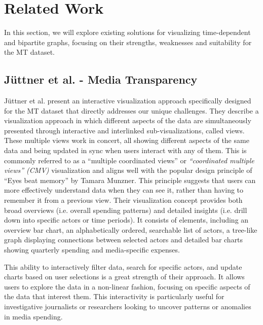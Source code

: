\documentclass{vgtc}                          %
\begin{document}
\section{Related Work} %


In this section, we will explore existing solutions for visualizing time-dependent and bipartite graphs, focusing on their strengths, weaknesses and suitability for the MT dataset.

\subsection{Jüttner et al. - Media Transparency}

Jüttner et al. \cite{Jttner2017MediaTI} present an interactive visualization approach specifically designed for the MT dataset that directly addresses our unique challenges.
They describe a visualization approach in which different aspects of the data are simultaneously presented through interactive and interlinked sub-visualizations, called views. These multiple views work in concert, all showing different aspects of the same data and being updated in sync when users interact with any of them. This is commonly referred to as a ``multiple coordinated views'' or \textit{``coordinated multiple views'' (CMV)} \cite{roberts2007state} visualization and aligns well with the popular design principle of ``Eyes beat memory'' by Tamara Munzner. This principle suggests that users can more effectively understand data when they can see it, rather than having to remember it from a previous view. Their visualization concept provides both broad overviews (i.e. overall spending patterns) and detailed insights (i.e. drill down into specific actors or time periods). It consists of elements, including an overview bar chart, an alphabetically ordered, searchable list of actors, a tree-like graph displaying connections between selected actors and detailed bar charts showing quarterly spending and media-specific expenses.

This ability to interactively filter data, search for specific actors, and update charts based on user selections is a great strength of their approach. It allows users to explore the data in a non-linear fashion, focusing on specific aspects of the data that interest them. This interactivity is particularly useful for investigative journalists or researchers looking to uncover patterns or anomalies in media spending.
\end{document}
